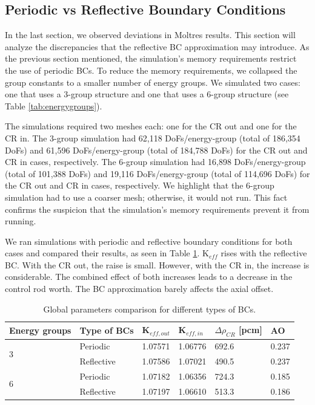 \subsection{Periodic vs Reflective Boundary Conditions}
\label{sec:bench-bcs}

In the last section, we observed deviations in Moltres results.
This section will analyze the discrepancies that the reflective \gls{BC} approximation may introduce.
As the previous section mentioned, the simulation's memory requirements restrict the use of periodic BCs.
To reduce the memory requirements, we collapsed the group constants to a smaller number of energy groups.
We simulated two cases: one that uses a 3-group structure and one that uses a 6-group structure (see Table \ref{tab:energygroups}).

The simulations required two meshes each: one for the CR out and one for the CR in.
The 3-group simulation had 62,118 DoFs/energy-group (total of 186,354 DoFs) and 61,596 DoFs/energy-group (total of 184,788 DoFs) for the CR out and CR in cases, respectively.
The 6-group simulation had 16,898 DoFs/energy-group (total of 101,388 DoFs) and 19,116 DoFs/energy-group (total of 114,696 DoFs) for the CR out and CR in cases, respectively.
We highlight that the 6-group simulation had to use a coarser mesh; otherwise, it would not run.
This fact confirms the suspicion that the simulation's memory requirements prevent it from running.

We ran simulations with periodic and reflective boundary conditions for both cases and compared their results, as seen in Table \ref{tab:benchmark-bc}.
K$_{eff}$ rises with the reflective BC.
With the CR out, the raise is small.
However, with the CR in, the increase is considerable.
The combined effect of both increases leads to a decrease in the control rod worth.
The BC approximation barely affects the axial offset.

\begin{table}[htbp!]
  \centering
  \caption{Global parameters comparison for different types of BCs.}
  \begin{tabular}{l|l|l|l|l|l}
  \toprule
  Energy groups       & Type of BCs & K$_{eff, out}$ & K$_{eff, in}$ & $\Delta \rho_{CR}$ [pcm] & AO \\
  \midrule
  \multirow{2}{*}{3}  & Periodic     & 1.07571		& 1.06776		& 692.6		& 0.237		\\
                      & Reflective   & 1.07586	  & 1.07021   & 490.5		& 0.237	  \\ \hline
  \multirow{2}{*}{6}  & Periodic     & 1.07182		& 1.06356		& 724.3	  & 0.185  	\\
                      & Reflective   & 1.07197   	& 1.06610 	& 513.3		& 0.186		\\  
  \bottomrule
  \end{tabular}
  \label{tab:benchmark-bc}
\end{table}

